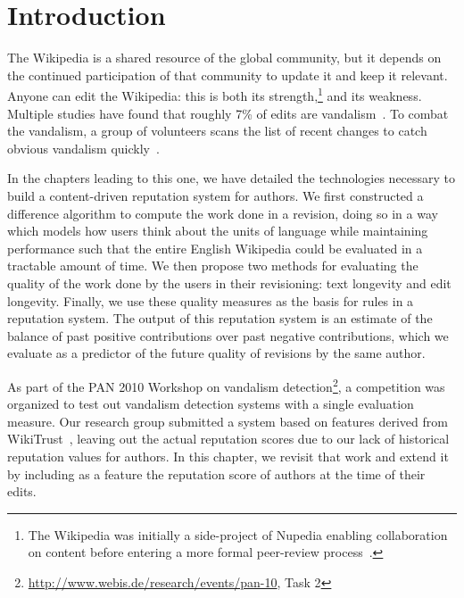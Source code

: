 \section{Introduction}

The Wikipedia is a shared resource of the global community, but it depends on
the continued participation of that community to update it and keep it relevant.
Anyone can edit the Wikipedia: this is both its strength,\footnote{The Wikipedia
was initially a side-project of Nupedia enabling collaboration on content
before entering a more formal peer-review process~\cite{wiki:Nupedia}.}
and its weakness.
Multiple studies have found that roughly 7\% of edits are
vandalism~\cite{Potthast2008,Potthast2010a}.
To combat the vandalism, a group of volunteers scans the list of recent changes
to catch obvious vandalism quickly~\cite{wiki:RCPatrol}.

In the chapters leading to this one, we have detailed the technologies
necessary to build a content-driven reputation system for authors.
We first constructed a difference algorithm to compute the work done in a
revision, doing so in a way which models how users think about the units of
language while maintaining performance such that the entire English Wikipedia
could be evaluated in a tractable amount of time.
We then propose two methods for evaluating the quality of the work done by the
users in their revisioning: text longevity and edit longevity.
Finally, we use these quality measures as the basis for rules in a reputation
system.
The output of this reputation system is an estimate of the balance of past
positive contributions over past negative contributions, which we evaluate
as a predictor of the future quality of revisions by the same author.

As part of the PAN 2010 Workshop on vandalism
detection\footnote{\url{http://www.webis.de/research/events/pan-10}, Task 2},
a competition was organized to test out vandalism detection systems with a
single evaluation measure.
Our research group submitted a system based on features derived from
WikiTrust~\cite{Adler2010b}, leaving out the actual reputation scores due
to our lack of historical reputation values for authors.
In this chapter, we revisit that work and extend it by including as a feature
the reputation score of authors at the time of their edits.

